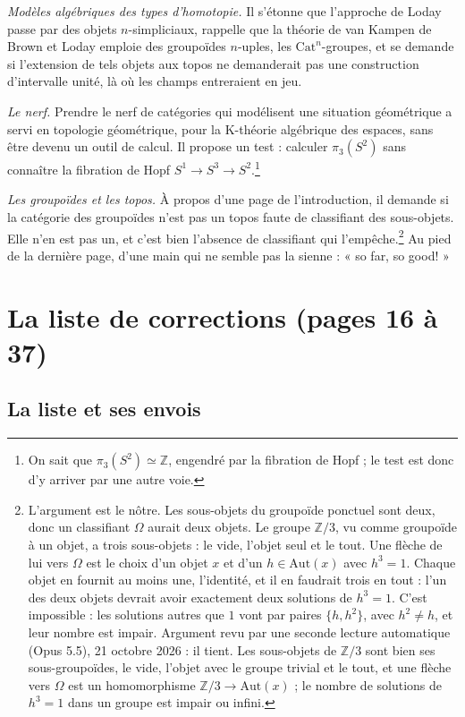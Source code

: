 \documentclass[11pt,a4paper]{article}
\begin{document}
\emph{Modèles algébriques des types d'homotopie.} Il s'étonne que l'approche de
Loday passe par des objets $n$-simpliciaux, rappelle que la théorie de van
Kampen de Brown et Loday emploie des groupoïdes $n$-uples, les
$\mathrm{Cat}^{n}$-groupes, et se demande si l'extension de tels objets aux
topos ne demanderait pas une construction d'intervalle unité, là où les
champs entreraient en jeu.

\emph{Le nerf.} Prendre le nerf de catégories qui modélisent une situation
géométrique a servi en topologie géométrique, pour la K-théorie algébrique des
espaces, sans être devenu un outil de calcul. Il propose un test : calculer
$\pi_{3}(S^{2})$ sans connaître la fibration de Hopf $S^{1} \to S^{3} \to
S^{2}$.\footnote{On sait que $\pi_{3}(S^{2}) \simeq \mathbb{Z}$, engendré
par la fibration de Hopf ; le test est donc d'y arriver par une autre voie.}

\emph{Les groupoïdes et les topos.} À propos d'une page de l'introduction, il
demande si la catégorie des groupoïdes n'est pas un topos faute de
classifiant des sous-objets. Elle n'en est pas un, et c'est bien l'absence de
classifiant qui l'empêche.\footnote{L'argument est le nôtre. Les sous-objets du
groupoïde ponctuel sont deux, donc un classifiant $\Omega$ aurait deux objets.
Le groupe $\mathbb{Z}/3$, vu comme groupoïde à un objet, a trois sous-objets :
le vide, l'objet seul et le tout. Une flèche de lui vers $\Omega$ est le choix
d'un objet $x$ et d'un $h \in \mathrm{Aut}(x)$ avec $h^{3} = 1$. Chaque objet
en fournit au moins une, l'identité, et il en faudrait trois en tout : l'un des
deux objets devrait avoir exactement deux solutions de $h^{3} = 1$. C'est
impossible : les solutions autres que $1$ vont par paires $\{h, h^{2}\}$, avec
$h^{2} \neq h$, et leur nombre est impair. Argument revu par une seconde lecture automatique (Opus 5.5), 21 octobre 2026 : il tient. Les sous-objets de $\mathbb{Z}/3$ sont bien ses sous-groupoïdes, le vide, l'objet avec le groupe trivial et le tout, et une flèche vers $\Omega$ est un homomorphisme $\mathbb{Z}/3 \to \mathrm{Aut}(x)$ ; le nombre de solutions de $h^{3} = 1$ dans un groupe est impair ou infini.}
Au pied de la dernière page, d'une main qui ne semble pas la sienne : « so
far, so good! »

\section*{La liste de corrections (pages 16 à 37)}

\subsection*{La liste et ses envois}
\end{document}
